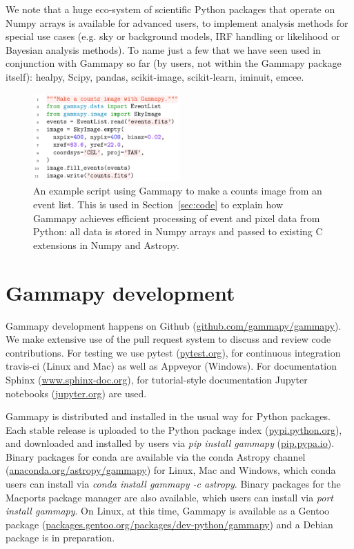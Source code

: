 \documentclass{PoS}
\newcommand{\urlGammapyGithub}{\href{https://github.com/gammapy/gammapy}{github.com/gammapy/gammapy}}
\newcommand{\urlPytest}{\href{https://pytest.org}{pytest.org}}
\newcommand{\urlSphinx}{\href{http://www.sphinx-doc.org}{www.sphinx-doc.org}}
\newcommand{\urlJupyter}{\href{https://jupyter.org}{jupyter.org}}
\newcommand{\urlPypi}{\href{https://pypi.python.org}{pypi.python.org}}
\newcommand{\urlPip}{\href{https://pip.pypa.io}{pip.pypa.io}}
\newcommand{\urlAnacondaGammapy}{\href{https://anaconda.org/astropy/gammapy}{anaconda.org/astropy/gammapy}}
\newcommand{\urlGentooGammapy}{\href{https://packages.gentoo.org/packages/dev-python/gammapy}{packages.gentoo.org/packages/dev-python/gammapy}}
\begin{document}
We note that a huge eco-system of scientific Python packages that operate on
Numpy arrays is available for advanced users, to implement analysis methods for
special use cases (e.g. sky or background models, IRF handling or likelihood or
Bayesian analysis methods). To name just a few that we have seen used in
conjunction with Gammapy so far (by users, not within the Gammapy package
itself): healpy, Scipy, pandas, scikit-image, scikit-learn, iminuit, emcee.

\begin{figure}[t]
\centering
\includegraphics[width=0.5\textwidth]{examples/code_events_image}
\caption{
An example script using Gammapy to make a counts image from an event list. This
is used in Section~\ref{sec:code} to explain how Gammapy achieves efficient
processing of event and pixel data from Python: all data is stored in Numpy
arrays and passed to existing C extensions in Numpy and Astropy.
}
\label{fig:code_example}
\end{figure}

\section{Gammapy development}

Gammapy development happens on Github (\urlGammapyGithub). We make extensive use
of the pull request system to discuss and review code contributions. For testing
we use pytest (\urlPytest), for continuous integration travis-ci (Linux and Mac)
as well as Appveyor (Windows). For documentation Sphinx (\urlSphinx), for
tutorial-style documentation Jupyter notebooks (\urlJupyter) are used.

Gammapy is distributed and installed in the usual way for Python packages. Each
stable release is uploaded to the Python package index (\urlPypi), and
downloaded and installed by users via {\it pip install gammapy} (\urlPip).
Binary packages for conda are available via the conda Astropy channel
(\urlAnacondaGammapy) for Linux, Mac and Windows, which conda users can install
via {\it conda install gammapy -c astropy}. Binary packages for the Macports
package manager are also available, which users can install via {\it port
install gammapy}. On Linux, at this time, Gammapy is available as a Gentoo
package (\urlGentooGammapy) and a Debian package is in preparation.
\end{document}
